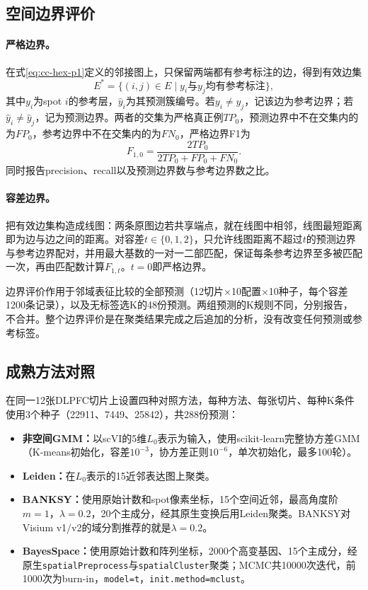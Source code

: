\subsection{空间边界评价}
\label{subsec:cc-boundary-p1}
\paragraph{严格边界。}在式\eqref{eq:cc-hex-p1}定义的邻接图上，只保留两端都有参考标注的边，得到有效边集
\begin{equation}
E^\ast=\{(i,j)\in E\mid y_i\text{与}y_j\text{均有参考标注}\},
\end{equation}
其中$y_i$为spot $i$的参考层，$\hat y_i$为其预测簇编号。若$y_i\ne y_j$，记该边为参考边界；若$\hat y_i\ne\hat y_j$，记为预测边界。两者的交集为严格真正例$TP_0$，预测边界中不在交集内的为$FP_0$，参考边界中不在交集内的为$FN_0$，严格边界F1为
\begin{equation}
F_{1,0}=\frac{2TP_0}{2TP_0+FP_0+FN_0}.
\label{eq:cc-boundary-f1-p1}
\end{equation}
同时报告precision、recall以及预测边界数与参考边界数之比。

\paragraph{容差边界。}把有效边集构造成线图：两条原图边若共享端点，就在线图中相邻，线图最短距离即为边与边之间的距离。对容差$t\in\{0,1,2\}$，只允许线图距离不超过$t$的预测边界与参考边界配对，并用最大基数的一对一二部匹配，保证每条参考边界至多被匹配一次，再由匹配数计算$F_{1,t}$。$t=0$即严格边界。

边界评价作用于邻域表征比较的全部预测（12切片$\times$10配置$\times$10种子，每个容差1200条记录），以及无标签选K的48份预测。两组预测的K规则不同，分别报告，不合并。整个边界评价是在聚类结果完成之后追加的分析，没有改变任何预测或参考标签。

\subsection{成熟方法对照}
\label{subsec:cc-baselines-p1}
在同一12张DLPFC切片上设置四种对照方法，每种方法、每张切片、每种K条件使用3个种子（22911、7449、25842），共288份预测：
\begin{itemize}
  \item \textbf{非空间GMM：}以scVI的5维$L_0$表示为输入，使用scikit-learn完整协方差GMM（K-means初始化，容差$10^{-3}$，协方差正则$10^{-6}$，单次初始化，最多100轮）。
  \item \textbf{Leiden：}在$L_0$表示的15近邻表达图上聚类\cite{traag2019}。
  \item \textbf{BANKSY：}使用原始计数和spot像素坐标，15个空间近邻，最高角度阶$m=1$，$\lambda=0.2$，20个主成分，经其原生变换后用Leiden聚类\cite{singhal2024}。BANKSY对Visium v1/v2的域分割推荐的就是$\lambda=0.2$。
  \item \textbf{BayesSpace：}使用原始计数和阵列坐标，2000个高变基因、15个主成分，经原生\texttt{spatialPreprocess}与\texttt{spatialCluster}聚类；MCMC共10000次迭代，前1000次为burn-in，\texttt{model=t}，\texttt{init.method=mclust}\cite{zhao2021}。
\end{itemize}

